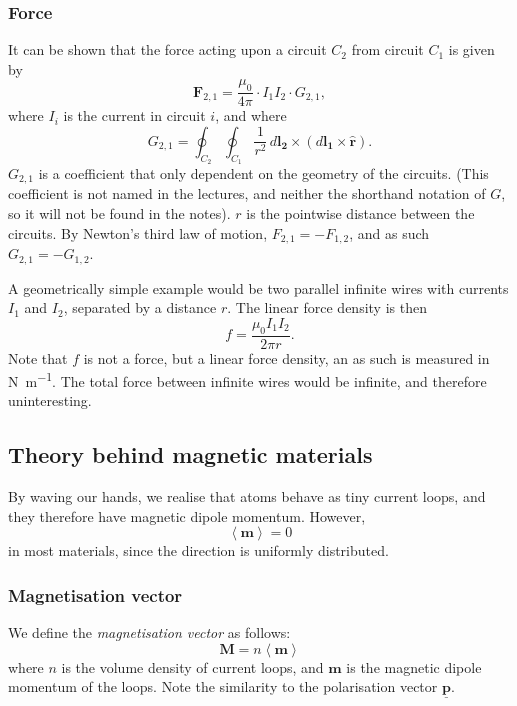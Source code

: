 \documentclass[a4paper, 12pt]{article}
\renewcommand{\vec}[1]{\bm{#1}}
\newcommand{\p}{\ensuremath{\vec{\underline{p}}}}
\let\tmp\hat
\renewcommand{\hat}[1]{\vec{\tmp{#1}}}
\begin{document}
        \subsubsection{Force}
            It can be shown that the force acting upon a circuit $C_2$ from circuit $C_1$ is given by
            \begin{equation}
                \vec{F}_{2,1} = \frac{\mu_0}{4\pi}\cdot I_1 I_2 \cdot G_{2,1},
            \end{equation}
            where $I_i$ is the current in circuit $i$, and where 
            \begin{equation}
                G_{2,1} = \oint_{C_2} \oint_{C_1} \frac{1}{r^2}\,d\vec{l_2}\times\left(d\vec{l_1} \times \hat{r}\right).
            \end{equation}
            $G_{2,1}$ is a coefficient that only dependent on the geometry of the circuits. 
            (This coefficient is not named in the lectures, and neither the shorthand notation of $G$, so it will not be found in the notes).
            $r$ is the pointwise distance between the circuits. By Newton's third law of motion, 
            $F_{2,1} = -F_{1,2}$, and as such $G_{2,1} = - G_{1,2}$.

            A geometrically simple example would be two parallel infinite wires with currents $I_1$ and $I_2$, 
            separated by a distance $r$. The linear force density is then
            \begin{equation}
                f = \frac{\mu_0 I_1 I_2}{2\pi r}.
            \end{equation}
            Note that $f$ is not a force, but a linear force density, an as such is measured in \si{\newton\per\metre}. 
            The total force between infinite wires would be infinite, and therefore uninteresting.

    \subsection{Theory behind magnetic materials}
        By waving our hands, we realise that atoms behave as tiny current loops, and they therefore have magnetic dipole momentum.
        However, 
        \begin{equation*}
            \left<\vec{m}\right> = 0
        \end{equation*}
        in most materials, since the direction is uniformly distributed. 

        \subsubsection{Magnetisation vector}
            We define the \textit{magnetisation vector} as follows:
            \begin{equation}
                \vec{M} = n\left<\vec{m}\right>
            \end{equation}
            where $n$ is the volume density of current loops, and $\vec{m}$ is the magnetic dipole momentum of the loops. 
            Note the similarity to the polarisation vector $\p$.
\end{document}
